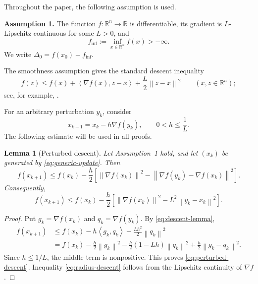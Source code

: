 \documentclass[11pt]{article}
\newtheorem{lemma}[theorem]{Lemma}
\theoremstyle{remark}
\newcommand{\R}{\mathbb{R}}
\newcommand{\norm}[1]{\left\lVert #1\right\rVert}
\newcommand{\inner}[2]{\left\langle #1,#2\right\rangle}
\newcommand{\fmin}{f_{\inf}}
\begin{document}
Throughout the paper, the following assumption is used.

\medskip
\noindent\textbf{Assumption 1.}
The function $f:\R^n\to\R$ is differentiable, its gradient is
$L$-Lipschitz continuous for some $L>0$, and
$$
   \fmin:=\inf_{x\in\R^n}f(x)>-\infty.
$$
We write
$\Delta_0=f(x_0)-\fmin$.

\medskip
The smoothness assumption gives the standard descent inequality
\begin{equation}\label{eq:descent-lemma}
  f(z)\leq f(x)+\inner{\nabla f(x)}{z-x}
              +\frac{L}{2}\norm{z-x}^2
  \qquad (x,z\in\R^n);
\end{equation}
see, for example, \cite{Bertsekas2016,Nesterov2018}.

For an arbitrary perturbation $y_k$, consider
\begin{equation}\label{eq:generic-update}
   x_{k+1}=x_k-h\nabla f(y_k),
   \qquad 0<h\leq \frac1L.
\end{equation}
The following estimate will be used in all proofs.

\begin{lemma}[Perturbed descent]\label{lem:perturbed-descent}
Let Assumption~1 hold, and let $(x_k)$ be generated by
\eqref{eq:generic-update}.  Then
\begin{equation}\label{eq:perturbed-descent}
  f(x_{k+1})
  \leq f(x_k)
  -\frac{h}{2}\left[
       \norm{\nabla f(x_k)}^2
       -\norm{\nabla f(y_k)-\nabla f(x_k)}^2
     \right].
\end{equation}
Consequently,
\begin{equation}\label{eq:radius-descent}
  f(x_{k+1})
  \leq f(x_k)
  -\frac{h}{2}\left[
       \norm{\nabla f(x_k)}^2-L^2\norm{y_k-x_k}^2
     \right].
\end{equation}
\end{lemma}

\begin{proof}
Put $g_k=\nabla f(x_k)$ and $q_k=\nabla f(y_k)$.
By \eqref{eq:descent-lemma},
\begin{align*}
f(x_{k+1})
&\leq f(x_k)-h\inner{g_k}{q_k}
                   +\frac{Lh^2}{2}\norm{q_k}^2\\
&=f(x_k)-\frac h2\norm{g_k}^2
          -\frac h2(1-Lh)\norm{q_k}^2
          +\frac h2\norm{g_k-q_k}^2.
\end{align*}
Since $h\leq1/L$, the middle term is nonpositive.  This proves
\eqref{eq:perturbed-descent}.  Inequality \eqref{eq:radius-descent} follows
from the Lipschitz continuity of $\nabla f$.
\end{proof}
\end{document}
